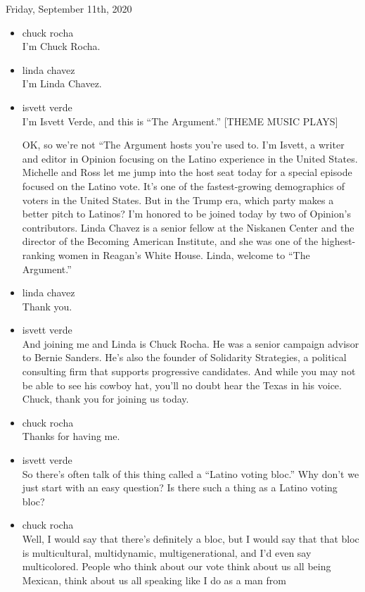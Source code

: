 Friday, September 11th, 2020

\begin{itemize}
\item
  chuck rocha\\
  I'm Chuck Rocha.
\item
  linda chavez\\
  I'm Linda Chavez.
\item
  isvett verde\\
  I'm Isvett Verde, and this is ``The Argument.'' {[}THEME MUSIC
  PLAYS{]}

  OK, so we're not ``The Argument hosts you're used to. I'm Isvett, a
  writer and editor in Opinion focusing on the Latino experience in the
  United States. Michelle and Ross let me jump into the host seat today
  for a special episode focused on the Latino vote. It's one of the
  fastest-growing demographics of voters in the United States. But in
  the Trump era, which party makes a better pitch to Latinos? I'm
  honored to be joined today by two of Opinion's contributors. Linda
  Chavez is a senior fellow at the Niskanen Center and the director of
  the Becoming American Institute, and she was one of the
  highest-ranking women in Reagan's White House. Linda, welcome to ``The
  Argument.''
\item
  linda chavez\\
  Thank you.
\item
  isvett verde\\
  And joining me and Linda is Chuck Rocha. He was a senior campaign
  advisor to Bernie Sanders. He's also the founder of Solidarity
  Strategies, a political consulting firm that supports progressive
  candidates. And while you may not be able to see his cowboy hat,
  you'll no doubt hear the Texas in his voice. Chuck, thank you for
  joining us today.
\item
  chuck rocha\\
  Thanks for having me.
\item
  isvett verde\\
  So there's often talk of this thing called a ``Latino voting bloc.''
  Why don't we just start with an easy question? Is there such a thing
  as a Latino voting bloc?
\item
  chuck rocha\\
  Well, I would say that there's definitely a bloc, but I would say that
  that bloc is multicultural, multidynamic, multigenerational, and I'd
  even say multicolored. People who think about our vote think about us
  all being Mexican, think about us all speaking like I do as a man from

\end{itemize}
